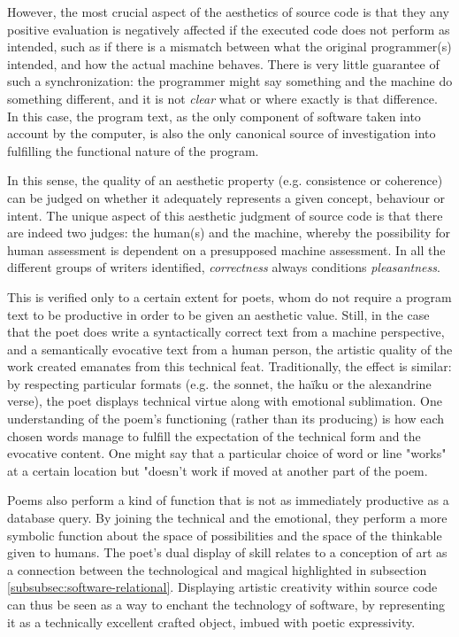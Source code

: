 However, the most crucial aspect of the aesthetics of source code is that they any positive evaluation is negatively affected if the executed code does not perform as intended, such as if there is a mismatch between what the original programmer(s) intended, and how the actual machine behaves. There is very little guarantee of such a synchronization: the programmer might say something and the machine do something different, and it is not \emph{clear} what or where exactly is that difference. In this case, the program text, as the only component of software taken into account by the computer, is also the only canonical source of investigation into fulfilling the functional nature of the program.

In this sense, the quality of an aesthetic property (e.g. consistence or coherence) can be judged on whether it adequately represents a given concept, behaviour or intent. The unique aspect of this aesthetic judgment of source code is that there are indeed two judges: the human(s) and the machine, whereby the possibility for human assessment is dependent on a presupposed machine assessment. In all the different groups of writers identified, \emph{correctness} always conditions \emph{pleasantness}.

This is verified only to a certain extent for poets, whom do not require a program text to be productive in order to be given an aesthetic value. Still, in the case that the poet does write a syntactically correct text from a machine perspective, and a semantically evocative text from a human person, the artistic quality of the work created emanates from this technical feat. Traditionally, the effect is similar: by respecting particular formats (e.g. the sonnet, the haïku or the alexandrine verse), the poet displays technical virtue along with emotional sublimation. One understanding of the poem's functioning (rather than its producing) is how each chosen words manage to fulfill the expectation of the technical form and the evocative content. One might say that a particular choice of word or line "works" at a certain location but "doesn't work if moved at another part of the poem.

Poems also perform a kind of function that is not as immediately productive as a database query. By joining the technical and the emotional, they perform a more symbolic function about the space of possibilities and the space of the thinkable given to humans. The poet's dual display of skill relates to a conception of art as a connection between the technological and magical highlighted in subsection \autoref{subsubsec:software-relational}. Displaying artistic creativity within source code can thus be seen as a way to enchant the technology of software, by representing it as a technically excellent crafted object, imbued with poetic expressivity.

